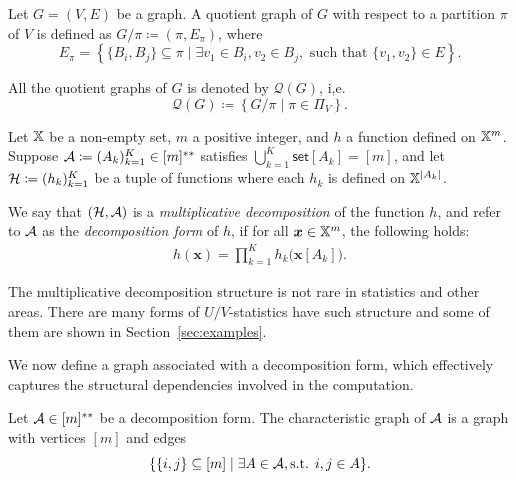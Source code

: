 \documentclass[letterpaper,11pt]{article}
\newcommand{\sPi}{\pi}
\newcommand{\samplespace}{\bbX}
\newcommand{\takesetp}[1]{\mathsf{set}[#1]}
\newcommand{\partition}{\Pi}
\newcommand{\partitionp}[1]{\partition_{#1}}
\newcommand{\quotientgraphp}[1]{\mathcal{Q}(#1)}
\begin{document}
\begin{definition}
Let $G = (V, E)$ be a graph.  
A quotient graph of $G$ with respect to a partition $\sPi$ of $V$ is defined as $G/\pi \coloneqq (\pi, E_{\pi})$, where
\begin{equation*}
    E_\pi = \left\{\{B_i,B_j\} \subseteq \pi \mid \exists v_1 \in B_i, v_2 \in B_j, \text{ such that } \{v_1, v_2\} \in E\right\}. 
\end{equation*}

All the quotient graphs of $G$ is denoted by $\quotientgraphp{G}$, i,e. 
\begin{equation*}
    \quotientgraphp{G} \coloneqq \left\{G/\pi \mid \pi \in \partitionp{V}\right\}. 
\end{equation*}
\end{definition}




\begin{definition}\label{def:mul_decomp}
    Let $\samplespace$ be a non-empty set, $m$ a positive integer, and $h$ a function defined on $\samplespace^m$. Suppose ${\mathcal{A}} \coloneqq (A_k)_{k=1}^K \in [m]^{**}$ satisfies $\bigcup_{k=1}^K \takesetp{A_k} = [m]$, and let ${\mathcal{H}} \coloneqq (h_k)_{k=1}^K$ be a tuple of functions where each $h_k$ is defined on $\samplespace^{|A_k|}$. 

    We say that $({\mathcal{H}}, {\mathcal{A}})$ is a \emph{multiplicative decomposition} of the function $h$, and refer to ${\mathcal{A}}$ as the \emph{decomposition form} of $h$, if for all $\bm{x} \in \samplespace^m$, the following holds:
    \begin{align*}
        h(\bm{x}) = \prod_{k=1}^K h_k\big(\bm{x}[A_k]\big).
    \end{align*}
\end{definition}


The multiplicative decomposition structure is not rare in statistics and other areas. There are many forms of $U/V$-statistics have such structure and some of them are shown in Section~\ref{sec:examples}. 

We now define a graph associated with a decomposition form, which effectively captures the structural dependencies involved in the computation. 


\begin{definition}\label{def:graph_decomp}
    Let ${\mathcal{A}} \in [m]^{**}$ be a decomposition form. The characteristic graph of ${\mathcal{A}}$ is a graph with vertices $[m]$ and edges
    \begin{equation*}
        \{\{i,j\} \subseteq [m] \mid \exists A \in {\mathcal{A}}, \text{s.t. } i,j \in A\}. 
    \end{equation*}
\end{definition}
\end{document}
